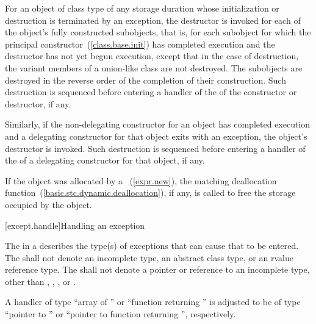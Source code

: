 \pnum
For an object of class type
of any storage duration whose initialization or destruction is terminated by an exception,
the destructor is invoked for each of the object's fully constructed
subobjects,
that is, for each subobject for which the principal
constructor~(\ref{class.base.init}) has completed execution
and the destructor has not yet begun execution,
except that in the case of destruction, the variant members of a
union-like class are not destroyed.
The subobjects are destroyed in the reverse order of the completion of
their construction. Such destruction is sequenced before entering a
handler of the  of the constructor or destructor,
if any.

\pnum
Similarly, if the non-delegating constructor for an object has
completed execution and a delegating constructor for that object exits with
an exception, the object's destructor is invoked.
Such destruction is sequenced before entering a handler of the
 of a delegating constructor for that object, if any.

\pnum
\enternote
If the object was allocated by a ~(\ref{expr.new}),
the matching deallocation function~(\ref{basic.stc.dynamic.deallocation}),
if any, is called to free the storage occupied by the object.
\exitnote


[except.handle]{Handling an exception}
%

\pnum
The
in a
describes the type(s) of exceptions that can cause
that
to be entered.
%
%
%
%
The
shall not denote an incomplete type, an abstract class type, or an rvalue reference type.
The
shall not denote a pointer or reference to an
incomplete type, other than
,
,
,
or
.

\pnum
A handler of type ``array of
''
or ``function returning
''
is adjusted to be of type ``pointer to
''
or ``pointer to function
returning
'',
respectively.

